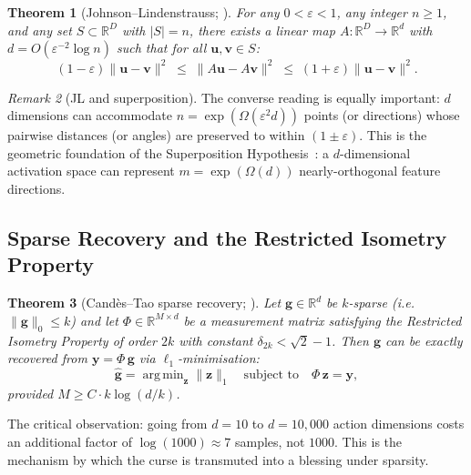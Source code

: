 \documentclass[11pt,a4paper]{article}
\theoremstyle{plain}
\newtheorem{theorem}{Theorem}[section]
\theoremstyle{definition}
\theoremstyle{remark}
\newtheorem{remark}[theorem]{Remark}
\newcommand{\R}{\mathbb{R}}
\newcommand{\norm}[1]{\| #1 \|}
\DeclareMathOperator*{\argmin}{arg\,min}
\begin{document}
\begin{theorem}[Johnson--Lindenstrauss; {\citealt{johnson1984extensions}}]%
\label{thm:jl}
For any $0 < \varepsilon < 1$, any integer $n \geq 1$, and any set
$S \subset \R^D$ with $|S| = n$, there exists a linear map
$A : \R^D \to \R^d$ with
$d = O(\varepsilon^{-2}\log n)$
such that for all $\mathbf{u}, \mathbf{v} \in S$:
\begin{equation}\label{eq:jl}
  (1-\varepsilon)\norm{\mathbf{u}-\mathbf{v}}^2
  \;\leq\; \norm{A\mathbf{u} - A\mathbf{v}}^2
  \;\leq\; (1+\varepsilon)\norm{\mathbf{u}-\mathbf{v}}^2.
\end{equation}
\end{theorem}

\begin{remark}[JL and superposition]
The converse reading is equally important: $d$ dimensions can accommodate
$n = \exp(\Omega(\varepsilon^2 d))$ points (or directions) whose pairwise
distances (or angles) are preserved to within $(1\pm\varepsilon)$.  This is the
geometric foundation of the Superposition Hypothesis~\citep{elhage2022superposition}:
a $d$-dimensional activation space can represent
$m = \exp(\Omega(d))$ nearly-orthogonal feature directions.
\end{remark}


\subsection{Sparse Recovery and the Restricted Isometry Property}%
\label{sec:rip}

\begin{theorem}[Candès--Tao sparse recovery; {\citealt{candes2005decoding}}]%
\label{thm:rip}
Let $\mathbf{g} \in \R^d$ be $k$-sparse (i.e.\ $\norm{\mathbf{g}}_0 \leq k$)
and let $\Phi \in \R^{M\times d}$ be a measurement matrix satisfying the
\emph{Restricted Isometry Property} of order $2k$ with constant
$\delta_{2k} < \sqrt{2}-1$.  Then $\mathbf{g}$ can be exactly recovered from
$\mathbf{y} = \Phi\,\mathbf{g}$ via $\ell_1$-minimisation:
\begin{equation}\label{eq:l1-recovery}
  \hat{\mathbf{g}} = \argmin_{\mathbf{z}} \norm{\mathbf{z}}_1
  \quad\text{subject to}\quad \Phi\,\mathbf{z} = \mathbf{y},
\end{equation}
provided $M \geq C \cdot k\log(d/k)$.
\end{theorem}

The critical observation: going from $d = 10$ to $d = 10{,}000$ action
dimensions costs an additional factor of $\log(1000) \approx 7$ samples, not
$1000$.  This is the mechanism by which the curse is transmuted into a blessing
under sparsity.
\end{document}

